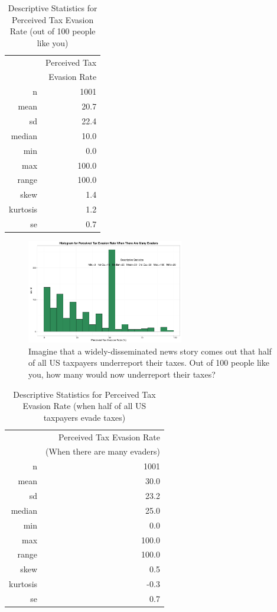 \documentclass{NSF_proposal_mod}
\begin{document}
\begin{table}[ht]
\centering
\begin{tabular}{rr}
  \hline
 & Perceived Tax\\
& Evasion Rate\\ 
  \hline
  n & 1001 \\ 
  mean & 20.7 \\ 
  sd & 22.4 \\ 
  median & 10.0 \\  
  min & 0.0 \\ 
  max & 100.0 \\ 
  range & 100.0 \\ 
  skew & 1.4 \\ 
  kurtosis & 1.2 \\ 
  se & 0.7 \\ 
   \hline
\end{tabular}
\caption{Descriptive Statistics for Perceived Tax Evasion Rate (out of 100 people like you)} 
\end{table}


\begin{figure}[h!]
\centering
\includegraphics[width = 0.61\textwidth]{HistPerceivedEvasionManyEvaders.pdf}
\caption{Imagine that a widely-disseminated news story comes out that half of all US taxpayers underreport their taxes. Out of 100 people like you, how many would now underreport their taxes?}
\label{Fig5}
\end{figure}


\begin{table}[ht]
\centering
\begin{tabular}{rr}
  \hline
 & Perceived Tax Evasion Rate\\ 
& (When there are many evaders)\\
  \hline
  n & 1001 \\ 
  mean & 30.0 \\ 
  sd & 23.2 \\ 
  median & 25.0 \\  
  min & 0.0 \\ 
  max & 100.0 \\ 
  range & 100.0 \\ 
  skew & 0.5 \\ 
  kurtosis & -0.3 \\ 
  se & 0.7 \\ 
   \hline
\end{tabular}
\caption{Descriptive Statistics for Perceived Tax Evasion Rate (when half of all US taxpayers evade taxes)} 
\end{table}
\end{document}
